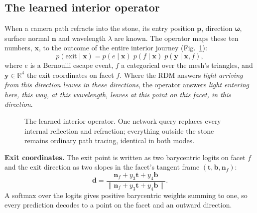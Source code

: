 \documentclass[conference]{IEEEtran}
\begin{document}
\subsection{The learned interior operator}

When a camera path refracts into the stone, its entry position $\mathbf{p}$,
direction $\boldsymbol{\omega}$, surface normal $\mathbf{n}$ and wavelength
$\lambda$ are known. The operator maps these ten numbers, $\mathbf{x}$, to the
outcome of the entire interior journey (Fig.~\ref{fig:operator}):
\begin{equation}
p(\text{exit}\mid\mathbf{x}) = p(e\mid\mathbf{x})\;p(f\mid\mathbf{x})\;p(\mathbf{y}\mid\mathbf{x},f),
\end{equation}
where $e$ is a Bernoulli escape event, $f$ a categorical over the mesh's
triangles, and $\mathbf{y}\in\mathbb{R}^4$ the exit coordinates on facet $f$.
Where the RDM answers \emph{light arriving from this direction leaves in these
directions}, the operator answers \emph{light entering here, this way, at this
wavelength, leaves at this point on this facet, in this direction}.

\begin{figure}[t]
\centering
{}
\caption{The learned interior operator. One network query replaces every
internal reflection and refraction; everything outside the stone remains
ordinary path tracing, identical in both modes.}
\label{fig:operator}
\end{figure}

\textbf{Exit coordinates.} The exit point is written as two barycentric logits
on facet $f$ and the exit direction as two slopes in the facet's tangent frame
$(\mathbf{t},\mathbf{b},\mathbf{n}_f)$:
\begin{equation}
\mathbf{d} = \frac{\mathbf{n}_f + y_3\mathbf{t} + y_4\mathbf{b}}{\lVert\mathbf{n}_f + y_3\mathbf{t} + y_4\mathbf{b}\rVert}.
\end{equation}
A softmax over the logits gives positive barycentric weights summing to one, so
every prediction decodes to a point on the facet and an outward direction.
\end{document}
